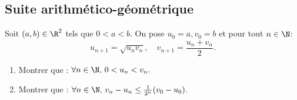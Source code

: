 \subsection{Suite arithmético-géométrique}

\begin{exercice}
Soit $(a, b) \in \R^2$ tels que $0<a<b.$ On pose $u_0=a, v_0=b$ et pour tout $n\in \N$:
$$ u_{n+1} =\sqrt{u_n v_n}, \quad v_{n+1} = \frac{u_n +v_n}{2}.$$
\begin{enumerate}
\item Montrer que :  $\forall n\in \N, \, 0<u_n<v_n.$
\item Montrer que :  $\forall n\in \N, \, v_n-u_n\leq \frac{1}{2^n}(v_0-u_0).$
\end{enumerate}
\end{exercice}


